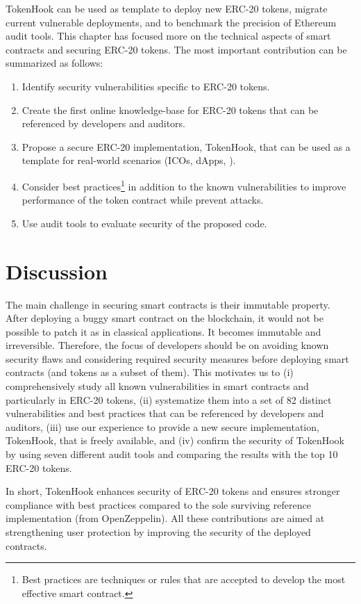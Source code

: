 TokenHook can be used as template to deploy new ERC-20 tokens, migrate current vulnerable deployments, and to benchmark the precision of Ethereum audit tools. This chapter has focused more on the technical aspects of smart contracts and securing ERC-20 tokens. The most important contribution can be summarized as follows:
\begin{enumerate}
	\item Identify security vulnerabilities specific to ERC-20 tokens.
	
	\item Create the first online knowledge-base for ERC-20 tokens that can be referenced by developers and auditors.
	
	\item Propose a secure ERC-20 implementation, TokenHook, that can be used as a template for real-world scenarios (\ie ICOs, dApps, \etc).
	
	\item Consider best practices\footnote{Best practices are techniques or rules that are accepted to develop the most effective smart contract.} in addition to the known vulnerabilities to improve performance of the token contract while prevent attacks.
	
	\item Use audit tools to evaluate security of the proposed code.
\end{enumerate}

\section{Discussion}
The main challenge in securing smart contracts is their immutable property. After deploying a buggy smart contract on the blockchain, it would not be possible to patch it as in classical applications. It becomes immutable and irreversible. Therefore, the focus of developers should be on avoiding known security flaws and considering required security measures before deploying smart contracts (and tokens as a subset of them). This motivates us to (i) comprehensively study all known vulnerabilities in smart contracts and particularly in ERC-20 tokens, (ii) systematize them into a set of 82 distinct vulnerabilities and best practices that can be referenced by developers and auditors, (iii) use our experience to provide a new secure implementation, TokenHook, that is freely available, and (iv) confirm the security of TokenHook by using seven different audit tools and comparing the results with the top 10 ERC-20 tokens. 

In short, TokenHook enhances security of ERC-20 tokens and ensures stronger compliance with best practices compared to the sole surviving reference implementation (from OpenZeppelin). All these contributions are aimed at strengthening user protection by improving the security of the deployed contracts.
